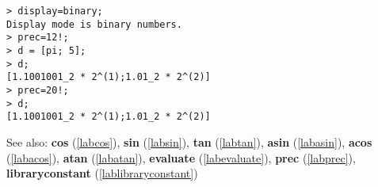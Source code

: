 \begin{center}\begin{minipage}{15cm}\begin{Verbatim}[frame=single]
> display=binary;
Display mode is binary numbers.
> prec=12!;
> d = [pi; 5];
> d;
[1.1001001_2 * 2^(1);1.01_2 * 2^(2)]
> prec=20!;
> d;
[1.1001001_2 * 2^(1);1.01_2 * 2^(2)]
\end{Verbatim}
\end{minipage}\end{center}
See also: \textbf{cos} (\ref{labcos}), \textbf{sin} (\ref{labsin}), \textbf{tan} (\ref{labtan}), \textbf{asin} (\ref{labasin}), \textbf{acos} (\ref{labacos}), \textbf{atan} (\ref{labatan}), \textbf{evaluate} (\ref{labevaluate}), \textbf{prec} (\ref{labprec}), \textbf{libraryconstant} (\ref{lablibraryconstant})
